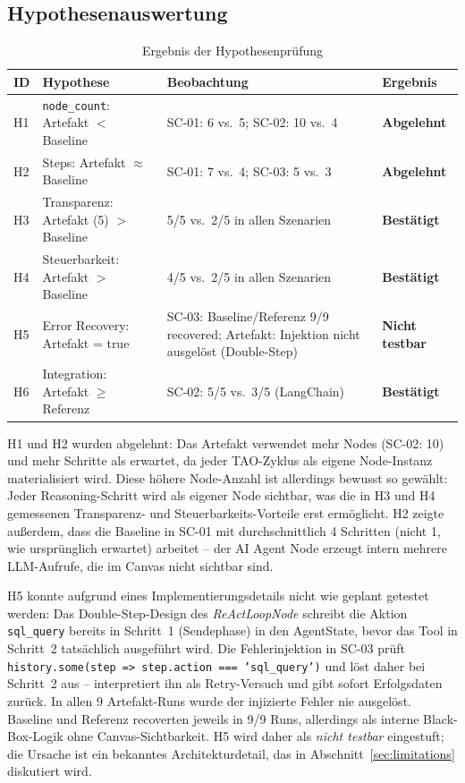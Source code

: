 \documentclass[12pt,a4paper,oneside]{report}
\begin{document}
\subsection{Hypothesenauswertung}
\label{sec:hypothesenauswertung}

\begin{table}[H]
  \centering
  \caption{Ergebnis der Hypothesenprüfung}
  \label{tab:hypothesen-ergebnis}
  \begin{tabularx}{\textwidth}{llXl}
    \toprule
    \textbf{ID} & \textbf{Hypothese} & \textbf{Beobachtung} & \textbf{Ergebnis} \\
    \midrule
    H1 & \texttt{node\_count}: Artefakt $<$ Baseline & SC-01: 6 vs.\ 5; SC-02: 10 vs.\ 4 & \textbf{Abgelehnt} \\
    H2 & Steps: Artefakt $\approx$ Baseline & SC-01: 7 vs.\ 4; SC-03: 5 vs.\ 3 & \textbf{Abgelehnt} \\
    H3 & Transparenz: Artefakt (5) $>$ Baseline & 5/5 vs.\ 2/5 in allen Szenarien & \textbf{Bestätigt} \\
    H4 & Steuerbarkeit: Artefakt $>$ Baseline & 4/5 vs.\ 2/5 in allen Szenarien & \textbf{Bestätigt} \\
    H5 & Error Recovery: Artefakt = true & SC-03: Baseline/Referenz 9/9 recovered; Artefakt: Injektion nicht ausgelöst (Double-Step) & \textbf{Nicht testbar} \\
    H6 & Integration: Artefakt $\geq$ Referenz & SC-02: 5/5 vs.\ 3/5 (LangChain) & \textbf{Bestätigt} \\
    \bottomrule
  \end{tabularx}
\end{table}

\noindent H1 und H2 wurden abgelehnt: Das Artefakt verwendet mehr Nodes (SC-02: 10)
und mehr Schritte als erwartet, da jeder \ac{TAO}-Zyklus als eigene Node-Instanz
materialisiert wird. Diese höhere Node-Anzahl ist allerdings bewusst so gewählt: Jeder
Reasoning-Schritt wird als eigener Node sichtbar, was die in H3 und H4 gemessenen
Transparenz- und Steuerbarkeits-Vorteile erst ermöglicht. H2 zeigte außerdem, dass
die Baseline in SC-01 mit durchschnittlich 4 Schritten (nicht 1, wie ursprünglich
erwartet) arbeitet -- der AI Agent Node erzeugt intern mehrere LLM-Aufrufe, die im
Canvas nicht sichtbar sind.

H5 konnte aufgrund eines Implementierungsdetails nicht wie geplant getestet werden:
Das Double-Step-Design des \textit{ReActLoopNode} schreibt die Aktion
\texttt{sql\_query} bereits in Schritt~1 (Sendephase) in den AgentState, bevor das
Tool in Schritt~2 tatsächlich ausgeführt wird. Die Fehlerinjektion in SC-03 prüft
\texttt{history.some(step => step.action === 'sql\_query')} und löst daher bei
Schritt~2 aus -- interpretiert ihn als Retry-Versuch und gibt sofort Erfolgsdaten
zurück. In allen 9 Artefakt-Runs wurde der injizierte Fehler nie ausgelöst.
Baseline und Referenz recoverten jeweils in 9/9 Runs, allerdings als interne
Black-Box-Logik ohne Canvas-Sichtbarkeit. H5 wird daher als \textit{nicht testbar}
eingestuft; die Ursache ist ein bekanntes Architekturdetail, das in
Abschnitt~\ref{sec:limitations} diskutiert wird.
\end{document}
